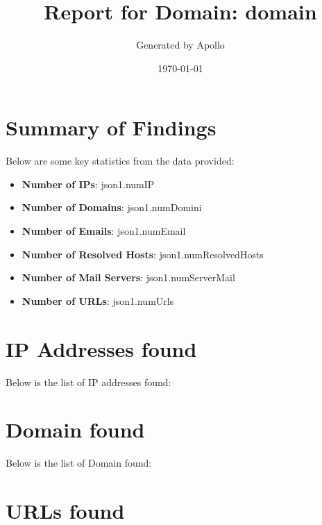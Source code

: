 \documentclass{article}
\title{Report for Domain: {{ domain }}}
\author{Generated by Apollo}
\date{\today}
\begin{document}
\maketitle

\section*{Summary of Findings}

Below are some key statistics from the data provided:

\begin{itemize}
    \item \textbf{Number of IPs}: {{ json1.numIP }}
    \item \textbf{Number of Domains}: {{ json1.numDomini }}
    \item \textbf{Number of Emails}: {{ json1.numEmail }}
    \item \textbf{Number of Resolved Hosts}: {{ json1.numResolvedHosts }}
    \item \textbf{Number of Mail Servers}: {{ json1.numServerMail }}
    \item \textbf{Number of URLs}: {{ json1.numUrls }}
\end{itemize}

\section*{IP Addresses found}

Below is the list of IP addresses found:




\section*{Domain found}

Below is the list of Domain found:

\scriptsize
{}
\normalsize


\section*{URLs found}
\end{document}
